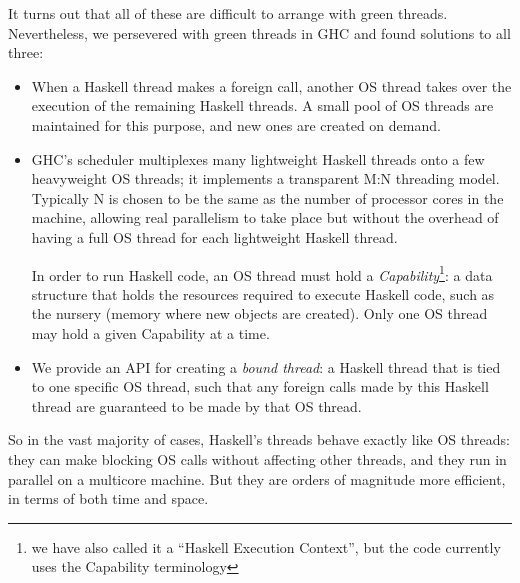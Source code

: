 \documentclass{article}
\begin{document}
It turns out that all of these are difficult to arrange with green
threads.  Nevertheless, we persevered with green threads in GHC and
found solutions to all three:

\begin{itemize}
\item When a Haskell thread makes a foreign call, another OS thread
  takes over the execution of the remaining Haskell threads.  A small
  pool of OS threads are maintained for this purpose, and new ones are
  created on demand.

\item GHC's scheduler multiplexes many lightweight Haskell threads
  onto a few heavyweight OS threads; it implements a transparent M:N
  threading model.  Typically N is chosen to be the same as the number
  of processor cores in the machine, allowing real parallelism to take
  place but without the overhead of having a full OS thread for each
  lightweight Haskell thread.

  In order to run Haskell code, an OS thread must hold a
  \emph{Capability}\footnote{we have also called it a ``Haskell
    Execution Context'', but the code currently uses the Capability
    terminology}: a data structure that holds the resources required
  to execute Haskell code, such as the nursery (memory where new
  objects are created).  Only one OS thread may hold a given
  Capability at a time.

\item We provide an API for creating a \emph{bound thread}: a Haskell
  thread that is tied to one specific OS thread, such that any foreign
  calls made by this Haskell thread are guaranteed to be made by that
  OS thread.
\end{itemize}

So in the vast majority of cases, Haskell's threads behave exactly
like OS threads: they can make blocking OS calls without affecting
other threads, and they run in parallel on a multicore machine.  But
they are orders of magnitude more efficient, in terms of both time and
space.
\end{document}
